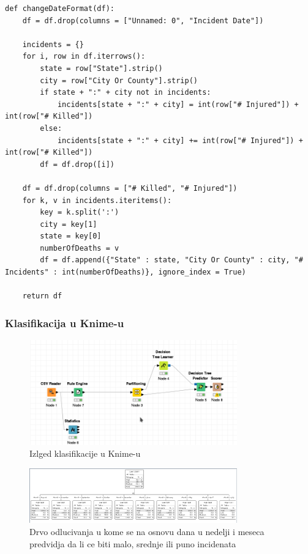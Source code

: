 \documentclass[11pt]{article} %
\begin{document}
	\begin{lstlisting}
def changeDateFormat(df):
	df = df.drop(columns = ["Unnamed: 0", "Incident Date"])
	
	incidents = {}
	for i, row in df.iterrows():
		state = row["State"].strip()
		city = row["City Or County"].strip()
		if state + ":" + city not in incidents:
			incidents[state + ":" + city] = int(row["# Injured"]) + int(row["# Killed"])
		else:
			incidents[state + ":" + city] += int(row["# Injured"]) + int(row["# Killed"])
		df = df.drop([i])
	
	df = df.drop(columns = ["# Killed", "# Injured"])
	for k, v in incidents.iteritems():
		key = k.split(':')
		city = key[1]
		state = key[0]
		numberOfDeaths = v
		df = df.append({"State" : state, "City Or County" : city, "# Incidents" : int(numberOfDeaths)}, ignore_index = True)
	
	return df
	\end{lstlisting}
	
	\subsubsection{Klasifikacija u Knime-u}
	
	\begin{figure}[h!]
        \includegraphics[width=0.8\textwidth]{klasifikacijaDanMesecKnime}
        \caption{Izlged klasifikacije u Knime-u}
	\end{figure}
	
	\begin{figure}[h!]
        \includegraphics[width=0.8\textwidth]{klasifikacijaDanMesec}
        \caption{Drvo odlucivanja u kome se na osnovu dana u nedelji i meseca predvidja da li ce biti malo, srednje ili puno incidenata}
	\end{figure}
	
\end{document}
